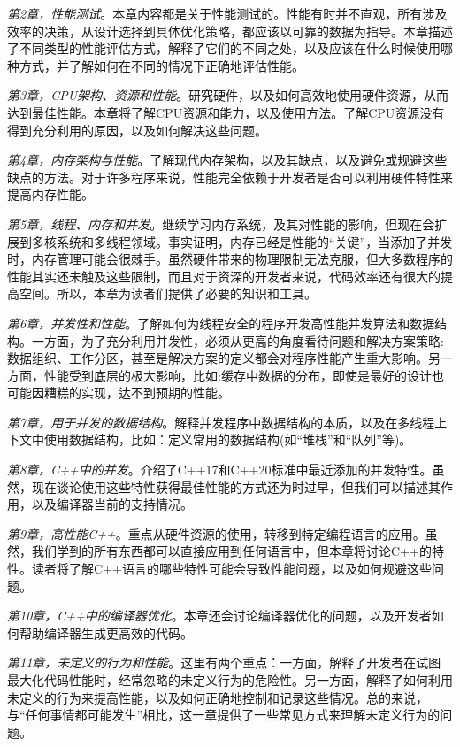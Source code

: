 \textit{第2章，性能测试}。本章内容都是关于性能测试的。性能有时并不直观，所有涉及效率的决策，从设计选择到具体优化策略，都应该以可靠的数据为指导。本章描述了不同类型的性能评估方式，解释了它们的不同之处，以及应该在什么时候使用哪种方式，并了解如何在不同的情况下正确地评估性能。

\textit{第3章，CPU架构、资源和性能}。研究硬件，以及如何高效地使用硬件资源，从而达到最佳性能。本章将了解CPU资源和能力，以及使用方法。了解CPU资源没有得到充分利用的原因，以及如何解决这些问题。

\textit{第4章，内存架构与性能}。了解现代内存架构，以及其缺点，以及避免或规避这些缺点的方法。对于许多程序来说，性能完全依赖于开发者是否可以利用硬件特性来提高内存性能。

\textit{第5章，线程、内存和并发}。继续学习内存系统，及其对性能的影响，但现在会扩展到多核系统和多线程领域。事实证明，内存已经是性能的“关键”，当添加了并发时，内存管理可能会很棘手。虽然硬件带来的物理限制无法克服，但大多数程序的性能其实还未触及这些限制，而且对于资深的开发者来说，代码效率还有很大的提高空间。所以，本章为读者们提供了必要的知识和工具。

\textit{第6章，并发性和性能}。了解如何为线程安全的程序开发高性能并发算法和数据结构。一方面，为了充分利用并发性，必须从更高的角度看待问题和解决方案策略:数据组织、工作分区，甚至是解决方案的定义都会对程序性能产生重大影响。另一方面，性能受到底层的极大影响，比如:缓存中数据的分布，即使是最好的设计也可能因糟糕的实现，达不到预期的性能。

\textit{第7章，用于并发的数据结构}。解释并发程序中数据结构的本质，以及在多线程上下文中使用数据结构，比如：定义常用的数据结构(如“堆栈”和“队列”等)。

\textit{第8章，C++中的并发}。介绍了C++17和C++20标准中最近添加的并发特性。虽然，现在谈论使用这些特性获得最佳性能的方式还为时过早，但我们可以描述其作用，以及编译器当前的支持情况。

\textit{第9章，高性能C++}。重点从硬件资源的使用，转移到特定编程语言的应用。虽然，我们学到的所有东西都可以直接应用到任何语言中，但本章将讨论C++的特性。读者将了解C++语言的哪些特性可能会导致性能问题，以及如何规避这些问题。

\textit{第10章，C++中的编译器优化}。本章还会讨论编译器优化的问题，以及开发者如何帮助编译器生成更高效的代码。

\textit{第11章，未定义的行为和性能}。这里有两个重点：一方面，解释了开发者在试图最大化代码性能时，经常忽略的未定义行为的危险性。另一方面，解释了如何利用未定义的行为来提高性能，以及如何正确地控制和记录这些情况。总的来说，与“任何事情都可能发生”相比，这一章提供了一些常见方式来理解未定义行为的问题。

